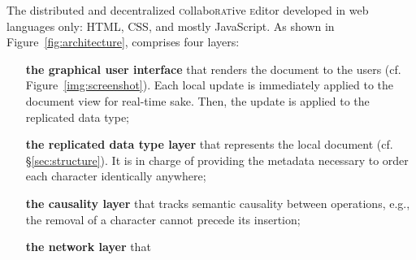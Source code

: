 The distributed and decentralized \textsc{c}ollabo\textsc{rat}ive
\textsc{e}ditor \CRATE developed in web languages only: HTML, CSS, and mostly
JavaScript. As shown in Figure~\ref{fig:architecture}, \CRATE comprises four
layers:
\begin{enumerate}[(i)]
\item [\textbf{the graphical user interface}] that renders the document to the users
  (cf. Figure~\ref{img:screenshot}). Each local update is immediately applied to
  the document view for real-time sake. Then, the update is applied to the
  replicated data type;
\item [\textbf{the replicated data type layer}] that represents the local document
  (cf. §\ref{sec:structure}). It is in charge of providing the metadata
  necessary to order each character identically anywhere;
\item [\textbf{the causality layer}] that tracks semantic causality between operations,
  e.g., the removal of a character cannot precede its insertion;
\item [\textbf{the network layer}] that
\end{enumerate}



